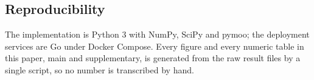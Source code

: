 \subsection*{Reproducibility}
The implementation is Python 3 with NumPy, SciPy and pymoo; the deployment services are
Go under Docker Compose. Every figure and every numeric table in this paper, main and
supplementary, is generated from the raw result files by a single script, so no number is
transcribed by hand.
